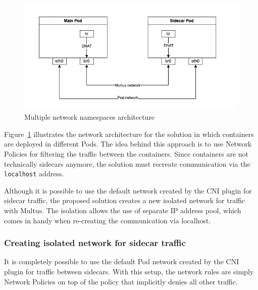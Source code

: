 \documentclass[english, 12pt, a4paper, sci, utf8, a-2b, online]{aaltothesis}
\begin{document}

\begin{figure}[h!]
  \centering
  \includegraphics[width=\linewidth]{files/multus.png}
  \caption{Multiple network namespaces architecture}
  \label{fig:multi-pod-net-solution}
\end{figure}

Figure~\ref{fig:multi-pod-net-solution} illustrates the network architecture for the solution in which containers are deployed in different Pods. The idea behind this approach is to use Network Policies for filtering the traffic between the containers. Since containers are not technically sidecars anymore, the solution must recreate communication via the \texttt{localhost} address.

Although it is possible to use the default network created by the CNI plugin for sidecar traffic, the proposed solution creates a new isolated network for traffic with Multus. The isolation allows the use of separate IP address pool, which comes in handy when re-creating the communication via localhost.

\subsubsection{Creating isolated network for sidecar traffic}



It is completely possible to use the default Pod network created by the CNI plugin for traffic between sidecars. With this setup, the network rules are simply Network Policies on top of the policy that implicitly denies all other traffic.
\end{document}
